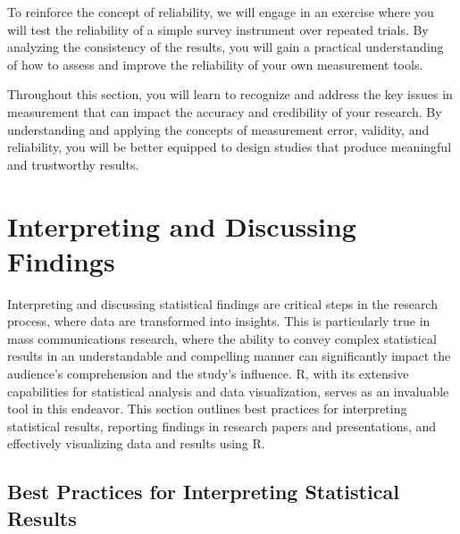 \documentclass[
]{book}
\begin{document}
To reinforce the concept of reliability, we will engage in an exercise where you will test the reliability of a simple survey instrument over repeated trials. By analyzing the consistency of the results, you will gain a practical understanding of how to assess and improve the reliability of your own measurement tools.

Throughout this section, you will learn to recognize and address the key issues in measurement that can impact the accuracy and credibility of your research. By understanding and applying the concepts of measurement error, validity, and reliability, you will be better equipped to design studies that produce meaningful and trustworthy results.

\section{Interpreting and Discussing Findings}\label{interpreting-and-discussing-findings}

Interpreting and discussing statistical findings are critical steps in the research process, where data are transformed into insights. This is particularly true in mass communications research, where the ability to convey complex statistical results in an understandable and compelling manner can significantly impact the audience's comprehension and the study's influence. R, with its extensive capabilities for statistical analysis and data visualization, serves as an invaluable tool in this endeavor. This section outlines best practices for interpreting statistical results, reporting findings in research papers and presentations, and effectively visualizing data and results using R.

\subsection*{Best Practices for Interpreting Statistical Results}\label{best-practices-for-interpreting-statistical-results}
\end{document}
